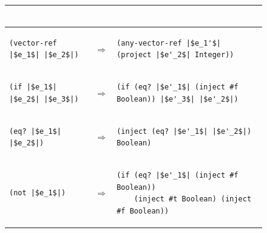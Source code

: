 \documentclass[7x10]{TimesAPriori_MIT}%
\numberwithin{theorem}{chapter}
\numberwithin{definition}{chapter}
\numberwithin{equation}{chapter}
\begin{document}
\begin{figure}[btp]
\begin{tcolorbox}[colback=white]
{\begin{tabular}{lll}
\begin{minipage}{0.65\textwidth}
\begin{lstlisting}
\end{lstlisting}
\end{minipage}
\\[2ex]\hline
\begin{minipage}{0.27\textwidth}
\begin{lstlisting}
(vector-ref |$e_1$| |$e_2$|)
\end{lstlisting}
\end{minipage}
&
$\Rightarrow$
&
\begin{minipage}{0.65\textwidth}
\begin{lstlisting}
(any-vector-ref |$e_1'$| (project |$e'_2$| Integer))
\end{lstlisting}
\end{minipage}
\\[2ex]\hline
\begin{minipage}{0.27\textwidth}
\begin{lstlisting}
(if |$e_1$| |$e_2$| |$e_3$|)
\end{lstlisting}
\end{minipage}
&
$\Rightarrow$
&
\begin{minipage}{0.65\textwidth}
\begin{lstlisting}
(if (eq? |$e'_1$| (inject #f Boolean)) |$e'_3$| |$e'_2$|)
\end{lstlisting}
\end{minipage}
\\[2ex]\hline
\begin{minipage}{0.27\textwidth}
\begin{lstlisting}
(eq? |$e_1$| |$e_2$|)
\end{lstlisting}
\end{minipage}
&
$\Rightarrow$
&
\begin{minipage}{0.65\textwidth}
\begin{lstlisting}
(inject (eq? |$e'_1$| |$e'_2$|) Boolean)
\end{lstlisting}
\end{minipage}
\\[2ex]\hline
\begin{minipage}{0.27\textwidth}
\begin{lstlisting}
(not |$e_1$|)
\end{lstlisting}
\end{minipage}
&
$\Rightarrow$
&
\begin{minipage}{0.65\textwidth}
\begin{lstlisting}
(if (eq? |$e'_1$| (inject #f Boolean))
    (inject #t Boolean) (inject #f Boolean))
\end{lstlisting}

\end{minipage}
\end{tabular}}
\end{tcolorbox}
\end{figure}
\end{document}
